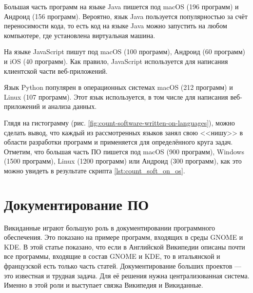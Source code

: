 Большая часть программ на языке Java пишется под macOS (196 программ) и Андроид (156 программ). 
Вероятно, язык Java пользуется популярностью 
за счёт переносимости кода, 
то есть код на языке Java можно запустить на любом компьютере, 
где установлена виртуальная машина. 

На языке JavaScript пишут под macOS (100 программ), 
Андроид (60 программ) и iOS (40 программ). Как правило, 
JavaScript используется для написания клиентской части веб-приложений.

Язык Python популярен в операционных системах macOS (212 программ) и Linux (107 программ). 
Этот язык используется, в том числе для написания веб-приложений и анализа данных.

Глядя на гистограмму (рис. \ref{fig:count-software-written-on-languages}), можно сделать вывод, что каждый из рассмотренных языков занял свою <<нишу>> в области разработки программ и применяется для определённого круга задач. Отметим, что большая часть ПО пишется под macOS (900 программ), Windows (1500 программ), Linux (1200 программ) или Андроид (300 программ), как это можно увидеть в результате скрипта \ref{lst:count_soft_on_os}.

\section{Документирование ПО}
Викиданные играют большую роль в документировании программного обеспечения. Это показано на примере программ, входящих в среды GNOME и KDE\autocite{Samuel2020DocumentingWiki}. В этой статье показано, что если в Английской Википедии описаны почти все программы, входящие в состав GNOME и KDE, то в итальянской и французской есть только часть статей. Документирование больших проектов --- это известная и трудная задача. Для её решения нужна централизованная система. Именно в этой роли и выступает связка Википедия и Викиданные\autocite{Samuel2020DocumentingWiki}.

